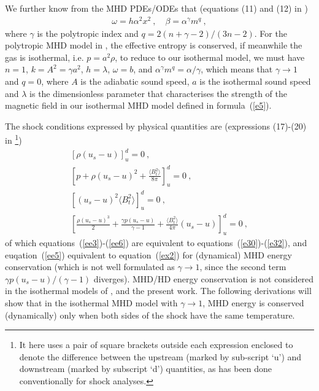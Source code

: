 \documentclass[fleqn,usenatbib]{mnras}
\begin{document}
We further know from the MHD PDEs/ODEs that (equations (11) and (12) in \citet{wang2008dynamic}) 
\begin{gather}
\omega=h\alpha^{2}x^{2}\ ,\quad \beta=\alpha^{\gamma}m^{q}\ ,\label{ee2}
\end{gather}
where $\gamma$ is the polytropic index and $q=2(n+\gamma-2)/(3n-2)$. For the polytropic MHD model in \citet{wang2008dynamic}, the effective entropy is conserved, if meanwhile the gas is isothermal, i.e. $p=a^{2}\rho$, to reduce to our isothermal model, we must have $n=1$, $k=A^{2}=\gamma a^{2}$, $h=\lambda$, $\omega=b$, and $\alpha^{\gamma}m^{q}=\alpha/\gamma$, which means that $\gamma\rightarrow 1$ and $q=0$, where $A$ is the adiabatic sound speed, $a$ is the isothermal sound speed and $\lambda$ is the dimensionless parameter that characterises the strength of the magnetic field in our isothermal MHD model defined in formula~(\ref{e5}).

The shock conditions expressed by physical quantities are (expressions (17)-(20) in \citet{wang2008dynamic}\footnote{It here uses a pair of square brackets outside each expression enclosed to denote the difference between the upstream (marked by sub-script `u') and downstream (marked by subscript `d') quantities, as has been done conventionally for shock analyses.})
\begin{gather}
\left[\rho\left(u_{s}-u\right)\right]_{u}^{d}=0\ ,\label{ee3}\\
\left[p+\rho\left(u_{s}-u\right)^{2}+\frac{\langle B_{t}^{2}\rangle}{8\pi}\right]_{u}^{d}=0\ ,\label{ee4}\\
\left[\left(u_{s}-u\right)^{2}\langle B_{t}^{2}\rangle\right]_{u}^{d}=0\ ,\label{ee6}\\
\left[\frac{\rho\left(u_{s}-u\right)^{3}}{2}+\frac{\gamma p\left(u_{s}-u\right)}{\gamma-1}+\frac{\langle B_{t}^{2}\rangle}{4\pi}\left(u_{s}-u\right)\right]_{u}^{d}=0\ ,\label{ee5}
\end{gather}
of which equations~(\ref{ee3})-(\ref{ee6}) are equivalent to equations~(\ref{e30})-(\ref{e32}), and euqation~(\ref{ee5}) equivalent to equation~(\ref{ex2}) for (dynamical) MHD energy conservation (which is not well formulated as $\gamma\rightarrow 1$, since the second term $\gamma p\left(u_{s}-u\right)/(\gamma-1)$ diverges). MHD/HD energy conservation is not considered in the isothermal models of \citet{lou2014self}, \citet{yuLou2006} and the present work. The following derivations will show that in the isothermal MHD model with $\gamma\rightarrow 1$, MHD energy is conserved (dynamically) only when both sides of the shock have the same temperature.
\end{document}

